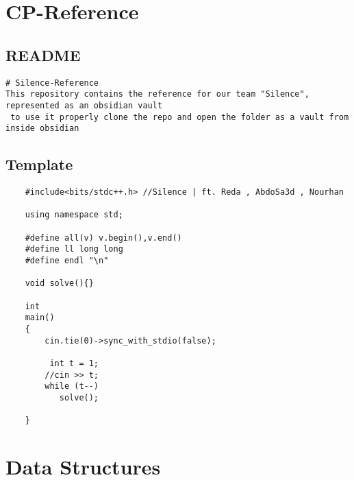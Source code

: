 \documentclass{article}
\begin{document}
\section{CP-Reference}

\subsection{README}
\begin{verbatim}
# Silence-Reference
This repository contains the reference for our team "Silence", represented as an obsidian vault
 to use it properly clone the repo and open the folder as a vault from inside obsidian
\end{verbatim}

\subsection{Template}
\begin{verbatim}
	#include<bits/stdc++.h> //Silence | ft. Reda , AbdoSa3d , Nourhan  
	  
	using namespace std;
	
	#define all(v) v.begin(),v.end()  
	#define ll long long  
	#define endl "\n"  
	  
	void solve(){}  
	  
	int  
	main()  
	{    
		cin.tie(0)->sync_with_stdio(false);
		
		 int t = 1;  
	    //cin >> t;  
	    while (t--)  
	       solve();  
	  
	}
\end{verbatim}

\section{Data Structures}
\end{document}
